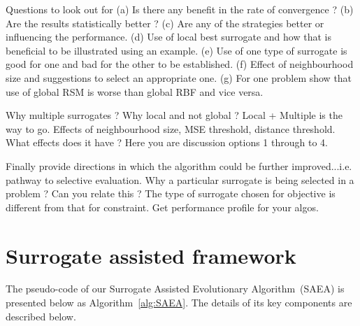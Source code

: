 Questions to look out for
(a) Is there any benefit in the rate of convergence ?
(b) Are the results statistically better ?
(c) Are any of the strategies better or influencing the performance.
(d) Use of local best surrogate and how that is beneficial to be illustrated using an example.
(e) Use of one type of surrogate is good for one and bad for the other to be established.
(f) Effect of neighbourhood size and suggestions to select an appropriate one.
(g) For one problem show that use of global RSM is worse than global RBF and vice versa.

Why multiple surrogates ? Why local and not global ? Local + Multiple is the way to go. 
Effects of neighbourhood size, MSE threshold, distance threshold. What effects does it have ? Here you are discussion options 1 through to 4. 

Finally provide directions in which the algorithm could be further improved...i.e. pathway to selective evaluation.
Why a particular surrogate is being selected in a problem ? Can you relate this ?
The type of surrogate chosen for objective is different from that for constraint.
Get performance profile for your algos.

\section{Surrogate assisted framework} 
\label{sec:saf}

The pseudo-code of our Surrogate Assisted Evolutionary Algorithm~(SAEA) is presented  below as Algorithm~\ref{alg:SAEA}. The details of its key components are described below.

